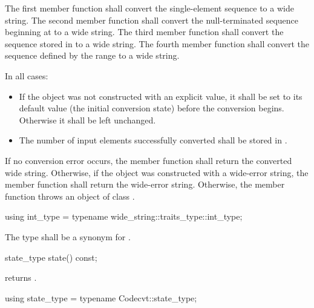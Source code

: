 \begin{itemdescr}
\pnum
\effects
The first member function shall convert the single-element sequence  to a
wide string. The second member function shall convert the null-terminated
sequence beginning at  to a wide string. The third member function
shall convert the sequence stored in  to a wide string. The fourth member
function shall convert the sequence defined by the range  to a
wide string.

\pnum
In all cases:

\begin{itemize}
\item If the  object was not constructed with an explicit value, it
shall be set to its default value (the initial conversion state) before the
conversion begins. Otherwise it shall be left unchanged.

\item The number of input elements successfully converted shall be stored in .
\end{itemize}

\pnum
\returns
If no conversion error occurs, the member function shall return the converted wide string.
Otherwise, if the object was constructed with a wide-error string, the
member function shall return the wide-error string.
Otherwise, the member function throws an object of class .
\end{itemdescr}

%
\begin{itemdecl}
using int_type = typename wide_string::traits_type::int_type;
\end{itemdecl}

\begin{itemdescr}
The type shall be a synonym for .
\end{itemdescr}

%
\begin{itemdecl}
state_type state() const;
\end{itemdecl}

\begin{itemdescr}
\pnum
returns .
\end{itemdescr}

%
\begin{itemdecl}
using state_type = typename Codecvt::state_type;
\end{itemdecl}

